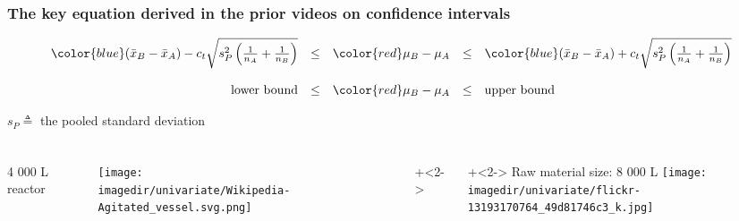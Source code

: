 \begin{frame}\frametitle{The key equation derived in the prior videos on confidence intervals}
	
	\[
		\begin{array}{rcccl}
			{\color{blue} (\bar{x}_B - \bar{x}_A) - c_t \sqrt{s_P^2 \left(\tfrac{1}{n_A} + \tfrac{1}{n_B}\right)}  } &\leq& {\color{red} \mu_B - \mu_A} &\leq& {\color{blue} (\bar{x}_B - \bar{x}_A) + c_t \sqrt{s_P^2 \left(\tfrac{1}{n_A} + \tfrac{1}{n_B} \right)} } \\ \\
			\text{lower bound} &\leq& {\color{red} \mu_B - \mu_A} &\leq& \text{upper bound}
		\end{array}
	\]

	\vspace{12pt}
	$s_P \triangleq$ the pooled standard deviation
\end{frame}

\begin{frame}\frametitle{}
	\begin{columns}[T]
			{\color{myOrange}4 000 L reactor}
			
			\vspace{-12pt}
			\texttt{[image: \\imagedir/univariate/Wikipedia-Agitated\_vessel.svg.png]}
			
			\onslide+<2->{
				\vspace{-20pt}
			}
			
			
			\onslide+<2->{
				{\color{myOrange}Raw material size: 8 000 L}
				\texttt{[image: \\imagedir/univariate/flickr-13193170764\_49d81746c3\_k.jpg]}
			}
	\end{columns}
\end{frame}

